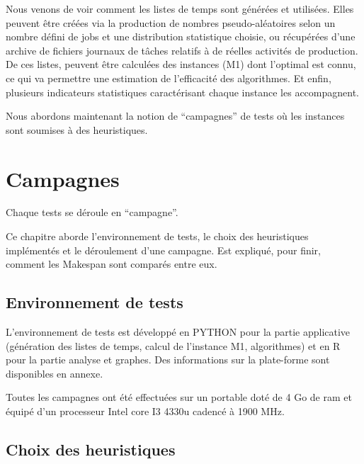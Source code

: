 \documentclass[a4paper,12pt]{report}
\theoremstyle{plain}				%
\theoremstyle{definition}				%
\begin{document}
\bigskip
Nous venons de voir comment les listes de temps sont générées et utilisées. 
Elles peuvent être créées via la production de nombres pseudo-aléatoires selon un nombre 
  défini de jobs et une distribution statistique choisie, 
  ou récupérées d'une archive de fichiers journaux de tâches relatifs à de réelles 
  activités de production.
De ces listes, peuvent être calculées des instances (M1) dont l'optimal est connu, 
  ce qui va permettre une estimation de l'efficacité des algorithmes.
Et enfin, plusieurs indicateurs statistiques caractérisant chaque instance les accompagnent.

Nous abordons maintenant la notion de ``campagnes'' de tests où les instances sont soumises à des heuristiques.  

\section{Campagnes} \label{sec:Campagnes}

Chaque tests se déroule en ``campagne''. 

Ce chapitre aborde l’environnement de tests, le choix des heuristiques implémentés et le déroulement d'une campagne. Est expliqué, pour finir, comment les Makespan sont comparés entre eux.

\subsection{Environnement de tests} \label{ssec:campagnesEnvironnementDeTests}

L'environnement de tests est développé 
  en PYTHON pour la partie applicative 
  (génération des listes de temps, calcul de l'instance M1, algorithmes) et 
  en R pour la partie analyse et graphes. 
Des informations sur la plate-forme sont disponibles en annexe.

Toutes les campagnes ont été effectuées sur un portable 
  doté de 4 Go de ram et 
  équipé d'un processeur Intel core I3 4330u cadencé à 1900 MHz.


\subsection{Choix des heuristiques} \label{campagneChoisHeuristiques}
\end{document}
